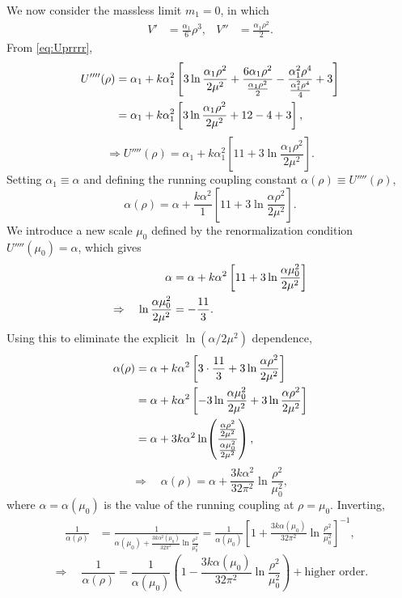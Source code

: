 We now consider the massless limit $m_1=0$, in which
\begin{align}
    V' &= \frac{\alpha_1}{6}\rho^3, &
    V'' &= \frac{\alpha_1\rho^2}{2}.
\end{align}
From \eqref{eq:Uprrrr},
\begin{align}
    U''''(\rho) &= \alpha_1 + k\alpha_1^2\left[
    3\ln\frac{\alpha_1\rho^2}{2\mu^2}
    + \frac{6\alpha_1\rho^2}{\frac{\alpha_1\rho^2}{2}}
    - \frac{\alpha_1^2\rho^4}{\frac{\alpha_1^2\rho^4}{4}} + 3\right]
    \notag\\
    &= \alpha_1 + k\alpha_1^2\left[
    3\ln\frac{\alpha_1\rho^2}{2\mu^2} + 12 - 4 + 3\right],
\end{align}
\begin{equation}
    \Rightarrow U''''(\rho) = \alpha_1 + k\alpha_1^2\left[11
    + 3\ln\frac{\alpha_1\rho^2}{2\mu^2}\right].
\end{equation}
Setting $\alpha_1 \equiv \alpha$ and defining the running coupling
constant $\alpha(\rho) \equiv U''''(\rho)$,
\begin{equation}
    \alpha(\rho) = \alpha + \frac{k\alpha^2}{1}\left[11
    + 3\ln\frac{\alpha\rho^2}{2\mu^2}\right].
\end{equation}
We introduce a new scale $\mu_0$ defined by the renormalization condition
$U''''(\mu_0) = \alpha$, which gives
\begin{align}
    \alpha &= \alpha + k\alpha^2\left[11
    + 3\ln\frac{\alpha\mu_0^2}{2\mu^2}\right] \notag\\
    \Rightarrow\quad\ln\frac{\alpha\mu_0^2}{2\mu^2} &= -\frac{11}{3}.
\end{align}
Using this to eliminate the explicit $\ln(\alpha/2\mu^2)$ dependence,
\begin{align}
    \alpha(\rho) &= \alpha + k\alpha^2\left[3\cdot\frac{11}{3}
    + 3\ln\frac{\alpha\rho^2}{2\mu^2}\right] \notag\\
    &= \alpha + k\alpha^2\left[-3\ln\frac{\alpha\mu_0^2}{2\mu^2}
    + 3\ln\frac{\alpha\rho^2}{2\mu^2}\right] \notag\\
    &= \alpha + 3k\alpha^2\ln\!\left(
    \frac{\frac{\alpha\rho^2}{2\mu^2}}
    {\frac{\alpha\mu_0^2}{2\mu^2}}\right),
\end{align}
\begin{equation}
    \Rightarrow\quad\boxed{\alpha(\rho) = \alpha
    + \frac{3k\alpha^2}{32\pi^2}\ln\frac{\rho^2}{\mu_0^2},}
\end{equation}
where $\alpha = \alpha(\mu_0)$ is the value of the running coupling at
$\rho=\mu_0$. Inverting,
\begin{align}
    \frac{1}{\alpha(\rho)}
    &= \frac{1}{\alpha(\mu_0) + \frac{3k\alpha^2(\mu_0)}{32\pi^2}
    \ln\frac{\rho^2}{\mu_0^2}}
    = \frac{1}{\alpha(\mu_0)}\left[1
    + \frac{3k\alpha(\mu_0)}{32\pi^2}
    \ln\frac{\rho^2}{\mu_0^2}\right]^{-1},
\end{align}
\begin{equation}
    \Rightarrow\quad\frac{1}{\alpha(\rho)}
    = \frac{1}{\alpha(\mu_0)}\left(1
    - \frac{3k\alpha(\mu_0)}{32\pi^2}
    \ln\frac{\rho^2}{\mu_0^2}\right)
    + \text{higher order.}
\end{equation}

